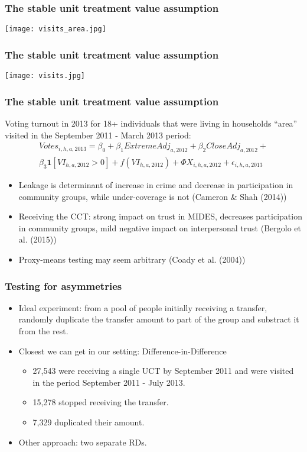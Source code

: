 \documentclass{beamer}
\begin{document}
\begin{frame}
\frametitle{The stable unit treatment value assumption}
\begin{center}
	\texttt{[image: visits\_area.jpg]}
	\label{visits_area}
\end{center}
\end{frame}

\begin{frame}
\frametitle{The stable unit treatment value assumption}
\begin{center}
	\texttt{[image: visits.jpg]}
	\label{visits}
\end{center}
\end{frame}

\begin{frame}
\frametitle{The stable unit treatment value assumption}
Voting turnout in 2013 for 18+ individuals that were living in households ``area'' visited in the September 2011 - March 2013 period:
\begin{multline}
Votes_{i,h,a,2013} = \beta _0 + \beta_1ExtremeAdj_{a,2012} +\beta_2CloseAdj_{a,2012} + \\
\beta_3\mathbf{1}[VI_{h,a,2012}>0] + f(VI_{h,a,2012}) + \Phi X_{i,h,a,2012} + \epsilon_{i,h,a,2013}
\end{multline}
\begin{itemize}
	\item Leakage is determinant of increase in crime and decrease in participation in community groups, while under-coverage is not (Cameron \& Shah (2014))
	\item Receiving the CCT: strong impact on trust in MIDES, decreases participation in community groups, mild negative impact on interpersonal trust (Bergolo et al. (2015))
	\item Proxy-means testing may seem arbitrary (Coady et al. (2004))
\end{itemize}

\end{frame}	
	
\begin{frame}
		\frametitle{Testing for asymmetries}
		\begin{itemize}
			\item Ideal experiment: from a pool of people initially receiving a transfer, randomly duplicate the transfer amount to part of the group and substract it from the rest.
			\item Closest we can get in our setting: Difference-in-Difference
			\begin{itemize}
				\item 27,543 were receiving a single UCT by September 2011 and were visited in the period September 2011 - July 2013.
				\item 15,278 stopped receiving the transfer.
				\item 7,329 duplicated their amount.
			\end{itemize}
			\item Other approach: two separate RDs.
		\end{itemize}
\end{frame}
\end{document}
